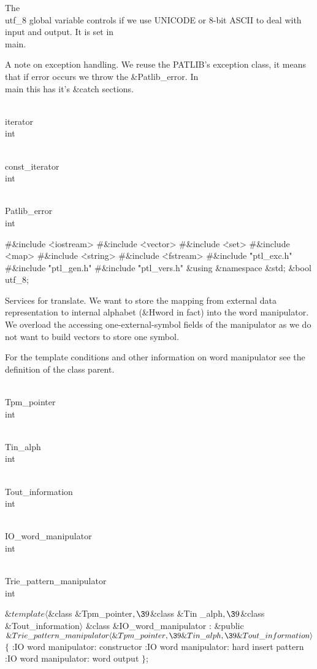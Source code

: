 \fi

The \\{utf\_8} global variable controls if we use UNICODE or 8-bit ASCII
to
deal with input and output. It is set in \\{main}.

A note on exception handling. We reuse the PATLIB's exception class, it
means that if error occurs we throw the \&{Patlib\_error}. In \\{main} this has
it's \&{catch} sections.

\Y\B\F\\{iterator} \5
\\{int}\par
\B\F\\{const\_iterator} \5
\\{int}\par
\B\F\\{Patlib\_error} \5
\\{int}\par
\Y\B\8\#\&{include} \.{<iostream>}\6
\8\#\&{include} \.{<vector>}\6
\8\#\&{include} \.{<set>}\6
\8\#\&{include} \.{<map>}\6
\8\#\&{include} \.{<string>}\6
\8\#\&{include} \.{<fstream>}\6
\8\#\&{include} \.{"ptl\_exc.h"}\6
\8\#\&{include} \.{"ptl\_gen.h"}\6
\8\#\&{include} \.{"ptl\_vers.h"}\6
\&{using} \&{namespace} \&{std};\6
\&{bool} \\{utf\_8};\par
\fi

Services for translate. We want to store the mapping from external
data representation to internal alphabet (\&{Hword} in fact) into the word
manipulator. We overload the accessing one-external-symbol fields of the
manipulator as we do not want to build vectors to store one symbol.

For the template conditions and other information on word manipulator
see the definition of the class parent.

\Y\B\F\\{Tpm\_pointer} \5
\\{int}\par
\B\F\\{Tin\_alph} \5
\\{int}\par
\B\F\\{Tout\_information} \5
\\{int}\par
\B\F\\{IO\_word\_manipulator} \5
\\{int}\par
\B\F\\{Trie\_pattern\_manipulator} \5
\\{int}\par
\Y\B$\&{template}\langle{}$\&{class} \&{Tpm\_pointer}${},\39{}$\&{class} \&{Tin%
\_alph}${},\39{}$\&{class} \&{Tout\_information}${}\rangle{}$\6
\&{class} \&{IO\_word\_manipulator} :\6
\&{public} ${}\&{Trie\_pattern\_manipulator}\langle\&{Tpm\_pointer},\39\&{Tin%
\_alph},\39\&{Tout\_information}\rangle{}$ ${}\{{}$\1\6
:IO word manipulator: constructor\X\6
:IO word manipulator: hard insert pattern\X\6
:IO word manipulator: word output\X\2\6
${}\}{}$;\par
\fi

